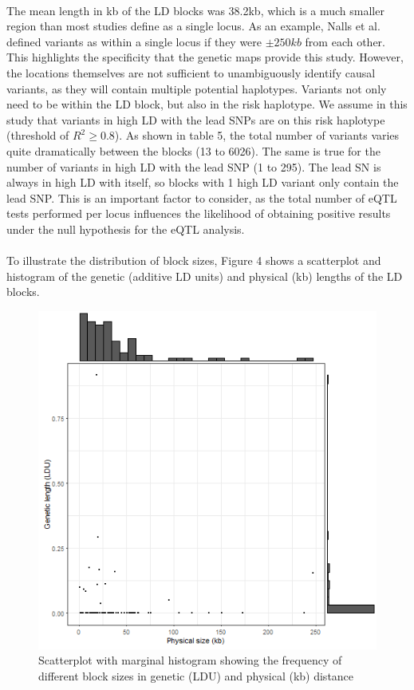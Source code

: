 \documentclass{article}
\begin{document}
\\The mean length in kb of the LD blocks was 38.2kb, which is a much smaller region than most studies define as a single locus. As an example, Nalls et al.\cite{Nalls2019IdentificationStudies} defined variants as within a single locus if they were $\pm 250kb$ from each other. This highlights the specificity that the genetic maps provide this study. However, the locations themselves are not sufficient to unambiguously identify causal variants, as they will contain multiple potential haplotypes. Variants not only need to be within the LD block, but also in the risk haplotype. We assume in this study that variants in high LD with the lead SNPs are on this risk haplotype (threshold of $R^2 \geq 0.8$). As shown in table 5, the total number of variants varies quite dramatically between the blocks (13 to 6026). The same is true for the number of variants in high LD with the lead SNP (1 to 295). The lead SN is always in high LD with itself, so blocks with 1 high LD variant only contain the lead SNP. This is an important factor to consider, as the total number of eQTL tests performed per locus influences the likelihood of obtaining positive results under the null hypothesis for the eQTL analysis. 
\\
\\To illustrate the distribution of block sizes, Figure 4 shows a scatterplot and histogram of the genetic (additive LD units) and physical (kb) lengths of the LD blocks.
\begin{figure}[!h]
    \centering
    \includegraphics[width=1\linewidth]{Thesis/thesis images/blockscatter.png}
    \caption{Scatterplot with marginal histogram showing the frequency of different block sizes in genetic (LDU) and physical (kb) distance}
    \label{fig:blockscatter}
\end{figure}
\end{document}
